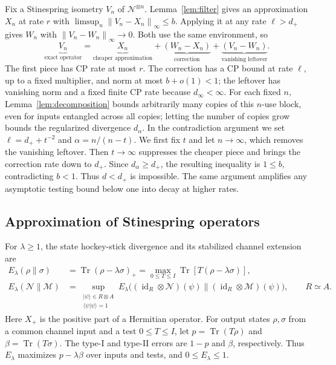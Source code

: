 \documentclass[11pt,letterpaper]{article}
\numberwithin{equation}{section}
\newcommand{\N}{\mathcal N}
\newcommand{\M}{\mathcal M}
\newcommand{\id}{\operatorname{id}}
\newcommand{\Tr}{\operatorname{Tr}}
\newcommand{\norm}[1]{\left\lVert#1\right\rVert}
\begin{document}
Fix a Stinespring isometry $V_n$ of $\N^{\otimes n}$. Lemma~\ref{lem:filter} gives an approximation $X_n$ at rate $r$ with $\limsup_n\norm{V_n-X_n}_\infty\le b$. Applying it at any rate $\ell>d_+$ gives $W_n$ with $\norm{V_n-W_n}_\infty\to0$. Both use the same environment, so
\[
 \underbrace{V_n}_{\text{exact operator}}
 =\underbrace{X_n}_{\text{cheaper approximation}}
 +\underbrace{(W_n-X_n)}_{\text{correction}}
 +\underbrace{(V_n-W_n)}_{\text{vanishing leftover}}.
\]
The first piece has CP rate at most $r$. The correction has a CP bound at rate $\ell$, up to a fixed multiplier, and norm at most $b+o(1)<1$; the leftover has vanishing norm and a fixed finite CP rate because $d_\infty<\infty$. For each fixed $n$, Lemma~\ref{lem:decomposition} bounds arbitrarily many copies of this $n$-use block, even for inputs entangled across all copies; letting the number of copies grow bounds the regularized divergence $d_\alpha$. In the contradiction argument we set $\ell=d_++t^{-2}$ and $\alpha=n/(n-t)$. We first fix $t$ and let $n\to\infty$, which removes the vanishing leftover. Then $t\to\infty$ suppresses the cheaper piece and brings the correction rate down to $d_+$. Since $d_\alpha\ge d_+$, the resulting inequality is $1\le b$, contradicting $b<1$. Thus $d<d_+$ is impossible. The same argument amplifies any asymptotic testing bound below one into decay at higher rates.

\subsection{Approximation of Stinespring operators}\label{sec:filter}
For $\lambda\ge1$, the state hockey-stick divergence \cite{SW} and its stabilized channel extension \cite{Gour} are
\begin{align}
 E_\lambda(\rho\|\sigma)
 &=\Tr(\rho-\lambda\sigma)_+
 =\max_{0\le T\le I}\Tr[T(\rho-\lambda\sigma)],\label{eq:hstate}\\
 E_\lambda(\N\|\M)
 &=\sup_{\substack{|\psi\rangle\in R\otimes A\\\langle\psi|\psi\rangle=1}}
 E_\lambda\bigl((\id_R\otimes\N)(\psi)\|
                    (\id_R\otimes\M)(\psi)\bigr),\qquad R\simeq A.
 \label{eq:hchannel}
\end{align}
Here $X_+$ is the positive part of a Hermitian operator. For output states $\rho,\sigma$ from a common channel input and a test $0\le T\le I$, let $p=\Tr(T\rho)$ and $\beta=\Tr(T\sigma)$. The type-I and type-II errors are $1-p$ and $\beta$, respectively. Thus $E_\lambda$ maximizes $p-\lambda\beta$ over inputs and tests, and $0\le E_\lambda\le1$.
\end{document}
